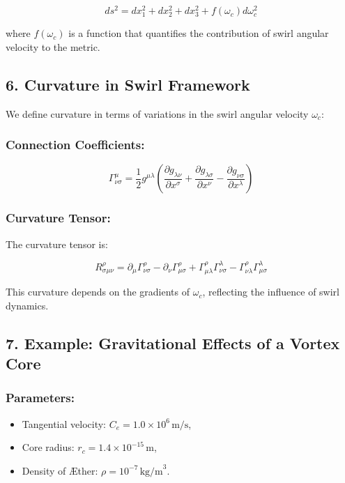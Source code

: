 {\[ds^2 = dx_1^2 + dx_2^2 + dx_3^2 + f(\omega_c) d\omega_c^2\]

where \(f(\omega_c)\) is a function that quantifies the contribution of swirl angular velocity to the metric.

\subsection*{6. Curvature in Swirl Framework}
We define curvature in terms of variations in the swirl angular velocity \(\omega_c\):

\subsubsection*{Connection Coefficients:}
\[\Gamma^\mu_{\nu\sigma} = \frac{1}{2} g^{\mu\lambda} \left( \frac{\partial g_{\lambda\nu}}{\partial x^\sigma} + \frac{\partial g_{\lambda\sigma}}{\partial x^\nu} - \frac{\partial g_{\nu\sigma}}{\partial x^\lambda} \right)\]

\subsubsection*{Curvature Tensor:}
The curvature tensor is:

\[R^\rho_{\sigma\mu\nu} = \partial_\mu \Gamma^\rho_{\nu\sigma} - \partial_\nu \Gamma^\rho_{\mu\sigma} + \Gamma^\rho_{\mu\lambda} \Gamma^\lambda_{\nu\sigma} - \Gamma^\rho_{\nu\lambda} \Gamma^\lambda_{\mu\sigma}\]

This curvature depends on the gradients of \(\omega_c\), reflecting the influence of swirl dynamics.

\subsection*{7. Example: Gravitational Effects of a Vortex Core}
\subsubsection*{Parameters:}
\begin{itemize}
\item Tangential velocity: \(C_e = 1.0 \times 10^6 \, \text{m/s}\),

\item Core radius: \(r_c = 1.4 \times 10^{-15} \, \text{m}\),

\item Density of Æther: \(\rho = 10^{-7} \, \text{kg/m}^3\).
\end{itemize}
}
